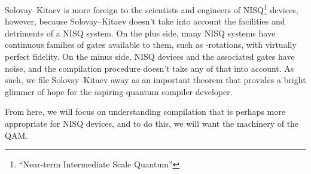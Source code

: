 Solovay--Kitaev is more foreign to the scientists and engineers of NISQ\footnote{``Near-term Intermediate Scale Quantum''} devices, however, because Solovay--Kitaev doesn't take into account the facilities and detriments of a NISQ system. On the plus side, many NISQ systems have continuous families of gates available to them, such as \PauliZ{}-rotations, with virtually perfect fidelity. On the minus side, NISQ devices and the associated gates have noise, and the compilation procedure doesn't take any of that into account. As such, we file Solovay--Kitaev away as an important theorem that provides a bright glimmer of hope for the aspiring quantum compiler developer.

From here, we will focus on understanding compilation that is perhaps more appropriate for NISQ devices, and to do this, we will want the machinery of the QAM.